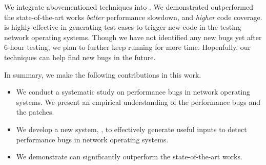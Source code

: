 We integrate abovementioned techniques into \sys.
%
We demonstrated \sys outperformed the state-of-the-art works \cite{slowfuzz, perffuzz} \emph{better} performance slowdown, and \emph{higher} code coverage.
\sys is highly effective in generating test cases to trigger new code in the testing network operating systems.
%
Though we have not identified any new bugs yet after 6-hour testing, we plan to further keep \sys running for more time.
%
Hopenfully, our techniques can help find new bugs in the future.

In summary, we make the following contributions in this work.
\begin{itemize}
    \item
        We conduct a systematic study on performance bugs in network operating systems.
        We present an empirical understanding of the performance bugs and the patches.
    \item We develop a new system, \sys, to effectively generate useful inputs to detect performance bugs in network operating systems.
    \item We demonstrate \sys can significantly outperform the state-of-the-art works.
\end{itemize}
